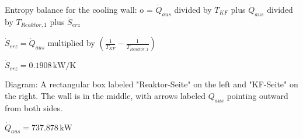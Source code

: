 Entropy balance for the cooling wall:  
o = \( \dot{Q}_{aus} \) divided by \( T_{KF} \) plus \( \dot{Q}_{aus} \) divided by \( T_{Reaktor,1} \) plus \( \dot{S}_{erz} \)  

\( \dot{S}_{erz} = \dot{Q}_{aus} \) multiplied by \( \left( \frac{1}{T_{KF}} - \frac{1}{T_{Reaktor,1}} \right) \)  

\( \dot{S}_{erz} = 0.1908 \, \text{kW/K} \)  

Diagram:  
A rectangular box labeled "Reaktor-Seite" on the left and "KF-Seite" on the right. The wall is in the middle, with arrows labeled \( \dot{Q}_{aus} \) pointing outward from both sides.  

\( \dot{Q}_{aus} = 737.878 \, \text{kW} \)